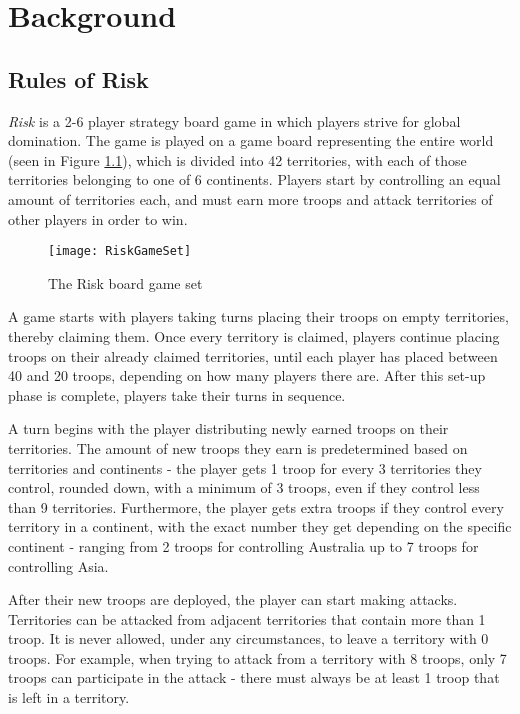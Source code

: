 \graphicspath{ {./Images/} }
\chapter{Background}
\label{background}
\section{Rules of Risk}
\label{rulesOfRisk}

\textit{Risk} \cite{riskrules} is a 2-6 player strategy board game in which players strive for global domination. The game is played on a game board representing the entire world (seen in Figure \ref{fig:RiskGameSet}), which is divided into 42 territories, with each of those territories belonging to one of 6 continents. Players start by controlling an equal amount of territories each, and must earn more troops and attack territories of other players in order to win.

\begin{figure}[H]
\texttt{[image: RiskGameSet]}
\caption{The Risk board game set}
\label{fig:RiskGameSet}
\end{figure}

A game starts with players taking turns placing their troops on empty territories, thereby claiming them. Once every territory is claimed, players continue placing troops on their already claimed territories, until each player has placed between 40 and 20 troops, depending on how many players there are. After this set-up phase is complete, players take their turns in sequence.

A turn begins with the player distributing newly earned troops on their territories. The amount of new troops they earn is predetermined based on territories and continents - the player gets 1 troop for every 3 territories they control, rounded down, with a minimum of 3 troops, even if they control less than 9 territories. Furthermore, the player gets extra troops if they control every territory in a continent, with the exact number they get depending on the specific continent - ranging from 2 troops for controlling Australia up to 7 troops for controlling Asia.

After their new troops are deployed, the player can start making attacks. Territories can be attacked from adjacent territories that contain more than 1 troop. It is never allowed, under any circumstances, to leave a territory with 0 troops. For example, when trying to attack from a territory with 8 troops, only 7 troops can participate in the attack - there must always be at least 1 troop that is left in a territory. 

